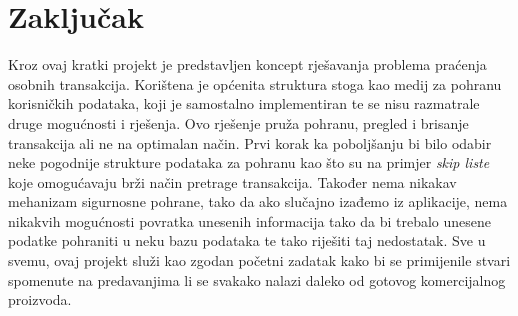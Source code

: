 \documentclass[12pt, letterpaper]{article}
\begin{document}
  \section{Zaključak}
  Kroz ovaj kratki projekt je predstavljen koncept rješavanja problema praćenja osobnih transakcija. Korištena je općenita struktura stoga kao medij za pohranu korisničkih podataka, koji je samostalno implementiran te se nisu razmatrale druge mogućnosti i rješenja. Ovo rješenje pruža pohranu, pregled i brisanje transakcija ali ne na optimalan način. Prvi korak ka poboljšanju bi bilo odabir neke pogodnije strukture podataka za pohranu kao što su na primjer \textit{skip liste} koje omogućavaju brži način pretrage transakcija. Također nema nikakav mehanizam sigurnosne pohrane, tako da ako slučajno izađemo iz aplikacije, nema nikakvih mogućnosti povratka unesenih informacija tako da bi trebalo unesene podatke pohraniti u neku bazu podataka te tako riješiti taj nedostatak. Sve u svemu, ovaj projekt služi kao zgodan početni zadatak kako bi se primijenile stvari spomenute na predavanjima li se svakako nalazi daleko od gotovog komercijalnog proizvoda.
\end{document}
